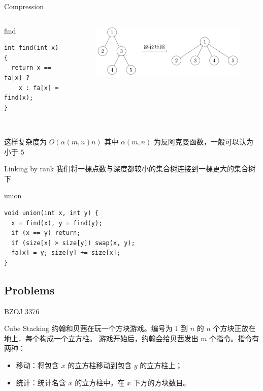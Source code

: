 \documentclass{beamer}
\begin{document}
\begin{frame}[fragile]{Compression}
   \begin{columns}[T,onlytextwidth]
    \begin{block}{find}
    \begin{lstlisting}
int find(int x) {
  return x == fa[x] ? 
    x : fa[x] = find(x);
}
    \end{lstlisting}
  \end{block}

   \begin{figure}
         \includegraphics[width=\linewidth]{pic/disjoint-set-compress.png}
   \end{figure}
    
  \end{columns}

  ~\\

  这样复杂度为 $O(\alpha (m, n) n)$ 其中 $\alpha (m, n)$ 为反阿克曼函数，一般可以认为小于 $5$
\end{frame}

\begin{frame}[fragile]{Linking by rank}
  我们将一棵点数与深度都较小的集合树连接到一棵更大的集合树下
  \begin{block}{union}
    \begin{lstlisting}
void union(int x, int y) {
  x = find(x), y = find(y);
  if (x == y) return;
  if (size[x] > size[y]) swap(x, y);
  fa[x] = y; size[y] += size[x];
}
    \end{lstlisting}
  \end{block}
\end{frame}

\subsection{Problems}
\begin{frame}[fragile]{BZOJ 3376}
  \begin{block}{Cube Stacking}
    约翰和贝茜在玩一个方块游戏。编号为 $1$ 到 $n$ 的 $n$ 个方块正放在地上．每个构成一个立方柱。
游戏开始后，约翰会给贝茜发出 $m$ 个指令。指令有两种：
\begin{itemize}
  \item 移动：将包含 $x$ 的立方柱移动到包含 $y$ 的立方柱上；
  \item 统计：统计名含 $x$ 的立方柱中，在 $x$ 下方的方块数目。
\end{itemize}
  \end{block}
  
\end{frame}
\end{document}
